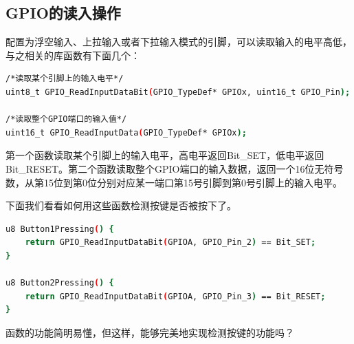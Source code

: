 	\subsection{GPIO的读入操作}
		配置为浮空输入、上拉输入或者下拉输入模式的引脚，可以读取输入的电平高低，与之相关的库函数有下面几个：
		\par 
		\begin{lstlisting}[language=bash, style=customStyleC]
/*读取某个引脚上的输入电平*/
uint8_t GPIO_ReadInputDataBit(GPIO_TypeDef* GPIOx, uint16_t GPIO_Pin);

/*读取整个GPIO端口的输入值*/
uint16_t GPIO_ReadInputData(GPIO_TypeDef* GPIOx);
		\end{lstlisting}
		\par 
		第一个函数读取某个引脚上的输入电平，高电平返回Bit\_SET，低电平返回Bit\_RESET。第二个函数读取整个GPIO端口的输入数据，返回一个16位无符号数，从第15位到第0位分别对应某一端口第15号引脚到第0号引脚上的输入电平。
		\par 
		下面我们看看如何用这些函数检测按键是否被按下了。
		\par 
		\begin{lstlisting}[language=bash, style=customStyleC, caption=按键检测]
u8 Button1Pressing() {
	return GPIO_ReadInputDataBit(GPIOA, GPIO_Pin_2) == Bit_SET;
}

u8 Button2Pressing() {
	return GPIO_ReadInputDataBit(GPIOA, GPIO_Pin_3) == Bit_RESET;
}
		\end{lstlisting}
		\par 
		函数的功能简明易懂，但这样，能够完美地实现检测按键的功能吗？
		
